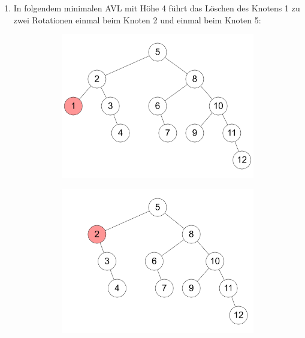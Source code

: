 \documentclass[11pt,a4paper]{article}
\begin{document}
\begin{loesung}
\begin{enumerate}
        \item In folgendem minimalen AVL mit Höhe 4 führt das Löschen des Knotens 1 zu zwei Rotationen einmal beim Knoten 2 und einmal beim Knoten 5:
        \begin{figure}[h!]
            \centering
            \begin{subfigure}[b]{0.23\textwidth}
                \centering
                \includegraphics[width=\textwidth]{img/3c_1}
                \caption*{}
            \end{subfigure}
            \begin{subfigure}[b]{0.23\textwidth}
                \centering
                \includegraphics[width=\textwidth]{img/3c_2}
                \caption*{}

\end{subfigure}
\end{figure}
\end{enumerate}
\end{loesung}
\end{document}
